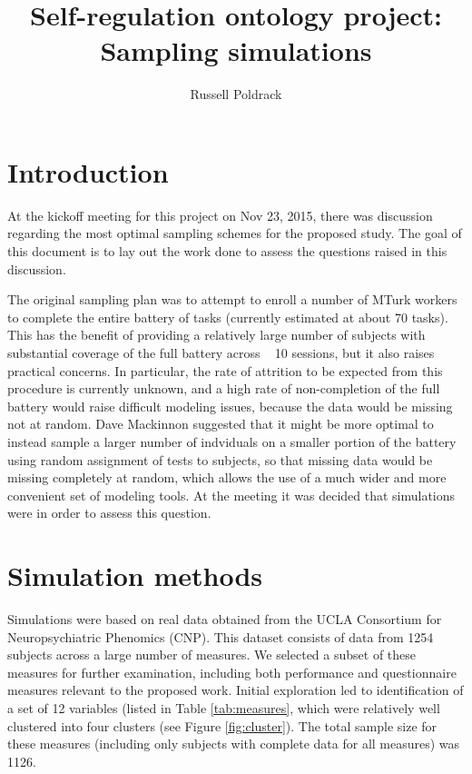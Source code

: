 \documentclass[11pt, oneside]{article}   	%
\title{Self-regulation ontology project: Sampling simulations}
\author{Russell Poldrack}
\begin{document}
\maketitle
\section{Introduction}
At the kickoff meeting for this project on Nov 23, 2015, there was discussion regarding the most optimal sampling schemes for the proposed study.  The goal of this document is to lay out the work done to assess the questions raised in this discussion.

The original sampling plan was to attempt to enroll a number of MTurk workers to complete the entire battery of tasks (currently estimated at about 70 tasks).  This has the benefit of providing a relatively large number of subjects with substantial coverage of the full battery across ~ 10 sessions, but it also raises practical concerns.  In particular, the rate of attrition to be expected from this procedure is currently unknown, and a  high rate of non-completion of the full battery would raise difficult modeling issues, because the data would be missing not at random.  Dave Mackinnon suggested that it might be more optimal to instead sample a larger number of indviduals on a smaller portion of the battery using random assignment of tests to subjects, so that missing data would be missing completely at random, which allows the use of a much wider and more convenient set of modeling tools.  At the meeting it was decided that simulations were in order to assess this question.

\section{Simulation methods}
Simulations were based on real data obtained from the UCLA Consortium for Neuropsychiatric Phenomics (CNP).  This dataset consists of data from 1254 subjects across a large number of measures.  We selected a subset of these measures for further examination, including both performance and questionnaire measures relevant to the proposed work.  Initial exploration led to identification of a set of 12 variables (listed in Table \ref{tab:measures}, which were relatively well clustered into four clusters (see Figure \ref{fig:cluster}).  The total sample size for these measures (including only subjects with complete data for all measures) was 1126.
\end{document}
